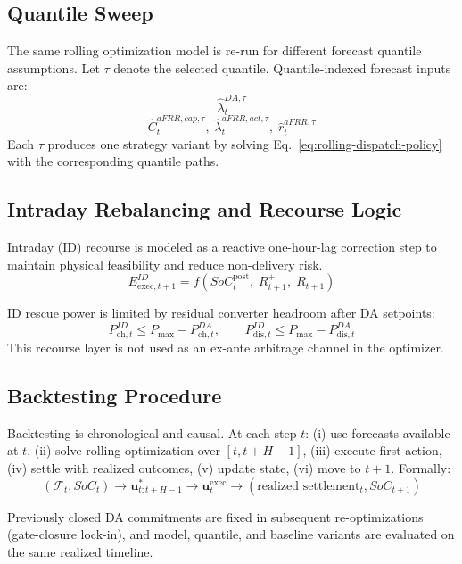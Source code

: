 \subsection{Quantile Sweep}
The same rolling optimization model is re-run for different forecast quantile assumptions. Let $\tau$ denote the selected quantile. Quantile-indexed forecast inputs are:
\begin{equation}\label{eq:qs-da}
    \hat{\lambda}^{DA,\tau}_t
\end{equation}
\begin{equation}\label{eq:qs-afrr}
    \hat{C}^{aFRR,cap,\tau}_t,\;
    \hat{\lambda}^{aFRR,act,\tau}_t,\;
    \hat{r}^{aFRR,\tau}_t
\end{equation}
Each $\tau$ produces one strategy variant by solving Eq.~\ref{eq:rolling-dispatch-policy} with the corresponding quantile paths.

\subsection{Intraday Rebalancing and Recourse Logic}
Intraday (ID) recourse is modeled as a reactive one-hour-lag correction step to maintain physical feasibility and reduce non-delivery risk.
\begin{equation}\label{eq:id-lag}
    E^{ID}_{\mathrm{exec},t+1}
    =
    f\!\left(SoC^{\mathrm{post}}_t,\;R^{+}_{t+1},\;R^{-}_{t+1}\right)
\end{equation}

ID rescue power is limited by residual converter headroom after DA setpoints:
\begin{equation}\label{eq:id-headroom}
    P^{ID}_{\mathrm{ch},t}\le P_{\max}-P^{DA}_{\mathrm{ch},t},
    \qquad
    P^{ID}_{\mathrm{dis},t}\le P_{\max}-P^{DA}_{\mathrm{dis},t}
\end{equation}
This recourse layer is not used as an ex-ante arbitrage channel in the optimizer.

\subsection{Backtesting Procedure}
Backtesting is chronological and causal. At each step $t$: (i) use forecasts available at $t$, (ii) solve rolling optimization over $[t,t+H-1]$, (iii) execute first action, (iv) settle with realized outcomes, (v) update state, (vi) move to $t+1$. Formally:
\begin{equation}\label{eq:backtest-loop}
    \left(\mathcal{F}_t,SoC_t\right)
    \rightarrow
    \mathbf{u}^{*}_{t:t+H-1}
    \rightarrow
    \mathbf{u}^{\mathrm{exec}}_t
    \rightarrow
    \left(\text{realized settlement}_t, SoC_{t+1}\right)
\end{equation}

Previously closed DA commitments are fixed in subsequent re-optimizations (gate-closure lock-in), and model, quantile, and baseline variants are evaluated on the same realized timeline.
